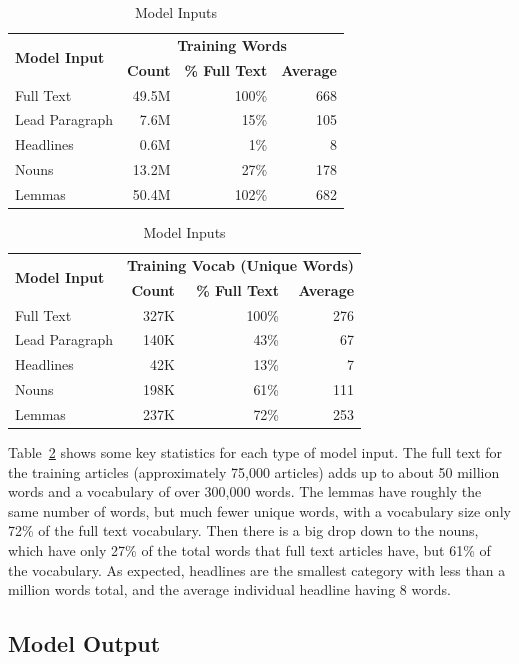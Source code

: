 \documentclass[11pt,a4paper,table]{article}
\begin{document}
\begin{table}
	\centering
	\small
	\begin{tabular}{lrrr}
		\toprule
		\multirow{2}{*}{\textbf{Model Input}} & \multicolumn{3}{c}{\textbf{Training Words}} \\
		\cmidrule{2-4}
		& \textbf{Count} & \textbf{\% Full Text} & \textbf{Average} \\
		\midrule
		Full Text			& 49.5M	& 100\%	& 668 \\
		Lead Paragraph	& 7.6M	& 15\%	& 105 \\
		Headlines			& 0.6M	& 1\%	& 8 \\
		Nouns			& 13.2M	& 27\%	& 178 \\
		Lemmas			& 50.4M	& 102\%	& 682 \\
		\bottomrule
	\end{tabular}
	\begin{tabular}{lrrr}
		\toprule
		\multirow{2}{*}{\textbf{Model Input}} & \multicolumn{3}{c}{\textbf{Training Vocab (Unique Words)}} \\
		\cmidrule{2-4}
		& \textbf{Count} & \textbf{\% Full Text} & \textbf{Average} \\
		\midrule
		Full Text			& 327K	& 100\%	& 276 \\
		Lead Paragraph	& 140K	& 43\%	& 67 \\
		Headlines			& 42K	& 13\%	& 7 \\
		Nouns			& 198K	& 61\%	& 111 \\
		Lemmas			& 237K	& 72\%	& 253 \\
		\bottomrule
	\end{tabular}
	\caption{Model Inputs}
	\label{tbl:inputs}
\end{table}


Table~\ref{tbl:inputs} shows some key statistics for each type of model input. The full text for the training articles (approximately 75,000 articles) adds up to about 50 million words and a vocabulary of over 300,000 words. The lemmas have roughly the same number of words, but much fewer unique words, with a vocabulary size only 72\% of the full text vocabulary. Then there is a big drop down to the nouns, which have only 27\% of the total words that full text articles have, but 61\% of the vocabulary. As expected, headlines are the smallest category with less than a million words total, and the average individual headline having 8 words.

\subsection{Model Output}
\label{ssec:output}
\end{document}
